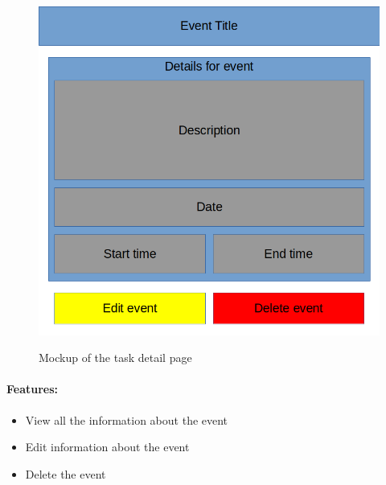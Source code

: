 \documentclass{article}
\begin{document}
\begin{minipage}{0.5\textwidth}
	\begin{figure}[H]
		\includegraphics[width=\linewidth]{Mockups/event_detail.png}
		\label{fig:event_detail_mockup}
		\caption{Mockup of the task detail page}
	\end{figure}
\end{minipage} \hfill
\begin{minipage}{0.45\textwidth}
	\paragraph{Features:}
	\begin{itemize}
		\item View all the information about the event
		\item Edit information about the event
		\item Delete the event
	\end{itemize}
\end{minipage}
\end{document}
